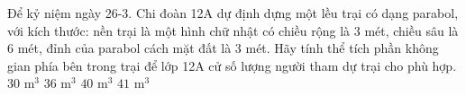 \begin{ex}%
	Để kỷ niệm ngày 26-3. Chi đoàn 12A dự định dựng một lều trại có dạng parabol, với kích thước: nền trại là một hình chữ nhật có chiều rộng là $3$ mét, chiều sâu là $6$ mét, đỉnh của parabol cách mặt đất là $3$ mét. Hãy tính thể tích phần không gian phía bên trong trại để lớp 12A cử số lượng người tham dự trại cho phù hợp.
	\choice
	{$30$ m$^3$}
	{\True $36$ m$^3$}
	{$40$ m$^3$}
	{$41$ m$^3$}
\end{ex}
